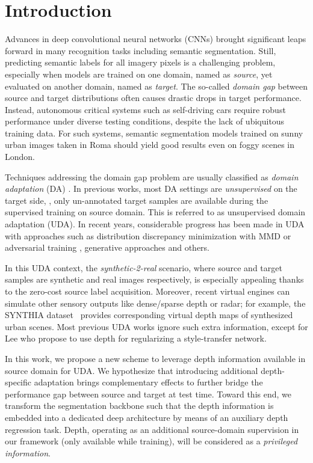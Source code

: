 \documentclass[10pt,twocolumn,letterpaper]{article}
\begin{document}
\section{Introduction}
	Advances in deep convolutional neural networks (CNNs) brought significant leaps forward in many recognition tasks including semantic segmentation.
Still, predicting semantic labels for all imagery pixels is a challenging problem, especially when models are trained on one domain, named as \textit{source}, yet evaluated on another domain, named as \textit{target}.
The so-called \textit{domain gap} between source and target distributions often causes drastic drops in target performance.
Instead, autonomous critical systems such as self-driving cars require robust performance under diverse testing conditions, despite the lack of ubiquitous training data. For such systems, semantic segmentation models trained on sunny urban images taken in Roma should yield good results even on foggy scenes in London.

Techniques addressing the domain gap problem are usually classified as \textit{domain adaptation} (DA) \cite{csurka2017domain}.
In previous works, most DA settings are \textit{unsupervised} on the target side, \ie, only un-annotated target samples are available during the supervised training on source domain. This is referred to as unsupervised domain adaptation (UDA). In recent years, considerable progress has been made in UDA with approaches such as distribution discrepancy minimization with MMD \cite{long2015learning, yan2017mind} or adversarial training \cite{hoffman2016fcns, tsai2018learning}, generative approaches \cite{hoffman18a} and others.

In this UDA context, the \textit{synthetic-2-real} scenario, where source and target samples are synthetic and real images respectively, is especially appealing thanks to the zero-cost source label acquisition.
Moreover, recent virtual engines can simulate other sensory outputs like dense/sparse depth or radar; for example, the SYNTHIA dataset~\cite{Ros_2016_CVPR} provides corresponding virtual depth maps of synthesized urban scenes.
Most previous UDA works ignore such extra information, except for Lee \etal \cite{lee2018spigan} who propose to use depth for regularizing a style-transfer network.

In this work, we propose a new scheme to leverage depth information available in source domain for UDA.
We hypothesize that introducing additional depth-specific adaptation brings complementary effects to further bridge the performance gap between source and target at test time.
Toward this end,  we transform the segmentation backbone such that the depth information is embedded into a dedicated deep architecture by means of an auxiliary depth regression task.
Depth, operating as an additional source-domain supervision in our framework (only available while training), will be considered as a \textit{privileged information}.
\end{document}
